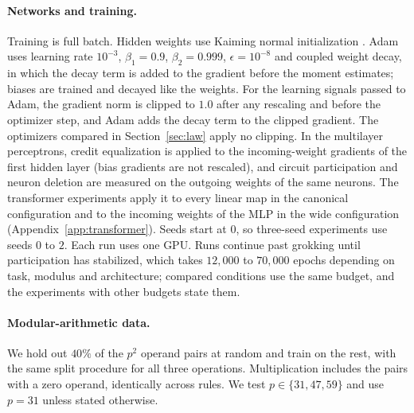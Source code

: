 \documentclass{article} %
\begin{document}
\paragraph{Networks and training.} Training is full batch. Hidden weights use Kaiming normal initialization \citep{he2015delving}. Adam uses learning rate $10^{-3}$, $\beta_1 = 0.9$, $\beta_2 = 0.999$, $\epsilon = 10^{-8}$ and coupled weight decay, in which the decay term is added to the gradient before the moment estimates; biases are trained and decayed like the weights. For the learning signals passed to Adam, the gradient norm is clipped to $1.0$ after any rescaling and before the optimizer step, and Adam adds the decay term to the clipped gradient. The optimizers compared in Section~\ref{sec:law} apply no clipping. In the multilayer perceptrons, credit equalization is applied to the incoming-weight gradients of the first hidden layer (bias gradients are not rescaled), and circuit participation and neuron deletion are measured on the outgoing weights of the same neurons. The transformer experiments apply it to every linear map in the canonical configuration and to the incoming weights of the MLP in the wide configuration (Appendix~\ref{app:transformer}). Seeds start at $0$, so three-seed experiments use seeds $0$ to $2$. Each run uses one GPU. Runs continue past grokking until participation has stabilized, which takes $12{,}000$ to $70{,}000$ epochs depending on task, modulus and architecture; compared conditions use the same budget, and the experiments with other budgets state them.

\paragraph{Modular-arithmetic data.} We hold out $40\%$ of the $p^2$ operand pairs at random and train on the rest, with the same split procedure for all three operations. Multiplication includes the pairs with a zero operand, identically across rules. We test $p \in \{31, 47, 59\}$ and use $p = 31$ unless stated otherwise.
\end{document}
